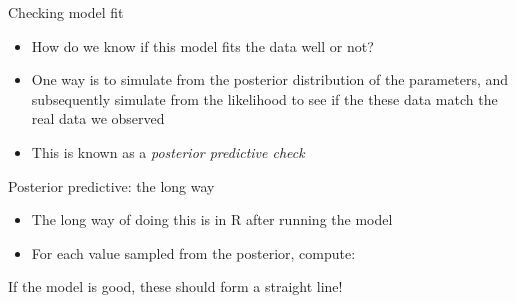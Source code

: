 \documentclass[ignorenonframetext,]{beamer}
\newenvironment{Shaded}{\begin{snugshade}}{\end{snugshade}}
\newcommand{\KeywordTok}[1]{\textcolor[rgb]{0.13,0.29,0.53}{\textbf{#1}}}
\newcommand{\DataTypeTok}[1]{\textcolor[rgb]{0.13,0.29,0.53}{#1}}
\newcommand{\DecValTok}[1]{\textcolor[rgb]{0.00,0.00,0.81}{#1}}
\newcommand{\StringTok}[1]{\textcolor[rgb]{0.31,0.60,0.02}{#1}}
\newcommand{\OperatorTok}[1]{\textcolor[rgb]{0.81,0.36,0.00}{\textbf{#1}}}
\newcommand{\NormalTok}[1]{#1}
\providecommand{\tightlist}{%
  \setlength{\itemsep}{0pt}\setlength{\parskip}{0pt}}
\begin{document}
\begin{frame}{Checking model fit}

\begin{itemize}
\tightlist
\item
  How do we know if this model fits the data well or not?
\item
  One way is to simulate from the posterior distribution of the
  parameters, and subsequently simulate from the likelihood to see if
  the these data match the real data we observed
\item
  This is known as a \emph{posterior predictive check}
\end{itemize}

\end{frame}

\begin{frame}[fragile]{Posterior predictive: the long way}

\begin{itemize}
\tightlist
\item
  The long way of doing this is in R after running the model
\item
  For each value sampled from the posterior, compute:
\end{itemize}

\begin{Shaded}
\end{Shaded}

If the model is good, these should form a straight line!

\end{frame}
\end{document}

